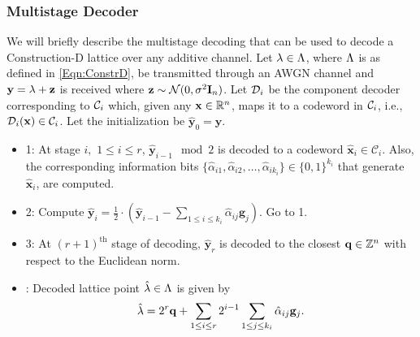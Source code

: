 \documentclass[journal,twocolumn]{IEEEtran}
\begin{document}
\subsubsection*{Multistage Decoder}
We will briefly describe the multistage decoding that can be used to decode a Construction-D lattice over any additive channel. Let $\lambda\in\Lambda$, where $\Lambda$ is as defined in \eqref{Eqn:ConstrD}, be transmitted through an AWGN channel and $\mathbf{y}=\lambda+\mathbf{z}$ is received where $\mathbf{z}\sim\mathcal{N}(0,\sigma^{2} \mathbf{I}_{n})$. Let $\mathcal{D}_{i}$ be the component decoder corresponding to $\mathcal{C}_{i}$ which, given any $\mathbf{x}\in\mathbb{R}^{n}$, maps it to a codeword in $\mathcal{C}_{i}$, i.e., $\mathcal{D}_{i}(\mathbf{x})\in\mathcal{C}_{i}$. Let the initialization be $\hat{\mathbf{y}}_{0}=\mathbf{y}$.
\begin{itemize}
\item {} 1: At stage $i, $ $1\leq i\leq r$, $\hat{\mathbf{y}}_{i-1}\mod 2$ is decoded to a codeword  $\hat{\mathbf{x}}_{i}\in \mathcal{C}_{i}$. Also, the corresponding information bits  $\{\hat{\alpha}_{i1},\hat{\alpha}_{i2},\ldots, \hat{\alpha}_{ik_{i}}\}\in \{0,1\}^{k_{i}}$ that generate $\hat{\mathbf{x}}_{i}$, are computed.
\item {} 2: Compute $\hat{\mathbf{y}}_{i}= \frac{1}{2} \cdot(\hat{\mathbf{y}}_{i-1}-\sum_{1\leq i\leq k_{i}}\hat{\alpha}_{ij}\mathbf{g}_j)$. Go to  1.
\item {} 3: At $(r+1)^{\text{th}}$ stage of decoding, $\hat{\mathbf{y}}_{r}$ is decoded to the closest $\mathbf{q}\in\mathbb{Z}^{n}$ with respect to the Euclidean norm.
\item {}: Decoded lattice point $\hat{\mathbf{\lambda}}\in\Lambda$ is given by
\begin{align}
    \hat{\mathbf{\lambda}}=2^{r}\mathbf{q}+\sum_{1\leq i\leq r}2^{i-1}\sum_{1\leq j\leq k_{i}}\hat{\alpha}_{ij}\mathbf{g}_{j}.
\end{align}

\end{itemize}
\end{document}
